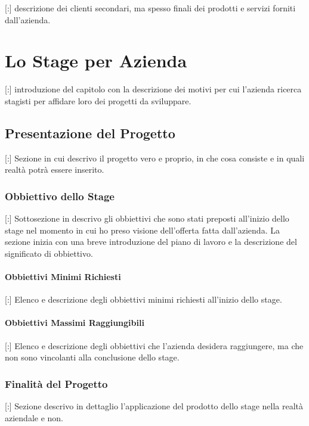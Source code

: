 \documentclass[11pt]{book}              %
\begin{document}
[:] descrizione dei clienti secondari, ma spesso finali dei prodotti e servizi forniti dall'azienda.


\chapter{Lo Stage per Azienda}
\thispagestyle{fancy} 

[:] introduzione del capitolo con la descrizione dei motivi per cui l'azienda ricerca stagisti per affidare loro dei progetti da sviluppare.

\section{Presentazione del Progetto}

[:] Sezione in cui descrivo il progetto vero e proprio, in che cosa consiste e in quali realtà potrà essere inserito.

\subsection{Obbiettivo dello Stage}

[:] Sottosezione in descrivo gli obbiettivi che sono stati preposti all'inizio dello stage nel momento in cui ho preso visione dell'offerta fatta dall'azienda.
La sezione inizia con una breve introduzione del piano di lavoro e la descrizione del significato di obbiettivo.

\subsubsection{Obbiettivi Minimi Richiesti}

[:] Elenco e descrizione degli obbiettivi minimi richiesti all'inizio dello stage.

\subsubsection{Obbiettivi Massimi Raggiungibili}

[:] Elenco e descrizione degli obbiettivi che l'azienda desidera raggiungere, ma che non sono vincolanti alla conclusione dello stage.

\subsection{Finalità del Progetto}

[:] Sezione descrivo in dettaglio l'applicazione del prodotto dello stage nella realtà aziendale e non.
\end{document}
